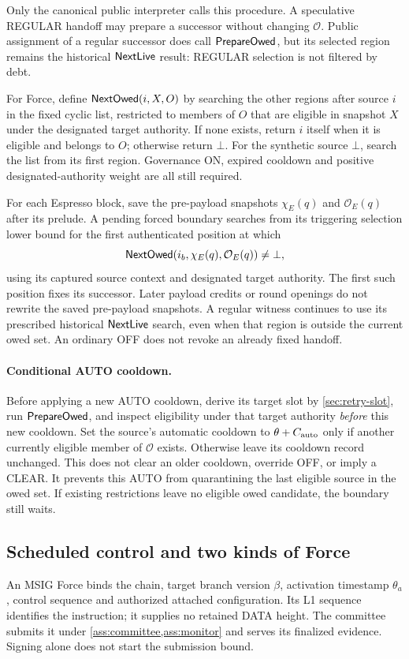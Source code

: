 Only the canonical public interpreter calls this procedure. A
speculative REGULAR handoff may prepare a successor without changing
$\mathcal O$. Public assignment of a regular successor does call
$\mathsf{PrepareOwed}$, but its selected region remains the historical
$\mathsf{NextLive}$ result: REGULAR selection is not filtered by debt.

For Force, define $\mathsf{NextOwed}(i,X,O)$ by searching the other
regions after source $i$ in the fixed cyclic list, restricted to
members of $O$ that are eligible in snapshot $X$ under the designated
target authority. If none exists, return $i$ itself when it is eligible
and belongs to $O$; otherwise return $\bot$. For the synthetic source
$\bot$, search the list from its first region. Governance ON,
expired cooldown and positive designated-authority weight are all
still required.

For each Espresso block, save the pre-payload snapshots
$\chi_E(q)$ and $\mathcal O_E(q)$ after its prelude. A pending forced
boundary searches from its triggering selection lower bound for the
first authenticated position at which
\[
 \mathsf{NextOwed}(i_b,\chi_E(q),\mathcal O_E(q))\ne\bot,
\]
using its captured source context and designated target authority.
The first such position fixes its successor. Later payload credits or
round openings do not rewrite the saved pre-payload snapshots. A
regular witness continues to use its prescribed historical
$\mathsf{NextLive}$ search, even when that region is outside the current
owed set. An ordinary OFF does not revoke an already fixed handoff.

\paragraph{Conditional AUTO cooldown.}
Before applying a new AUTO cooldown, derive its target slot by
\cref{sec:retry-slot}, run $\mathsf{PrepareOwed}$, and inspect eligibility
under that target authority \emph{before} this new cooldown. Set the
source's automatic cooldown to $\theta+C_{\rm auto}$ only if another
currently eligible member of $\mathcal O$ exists. Otherwise leave its
cooldown record unchanged. This does not clear an older cooldown,
override OFF, or imply a CLEAR. It prevents this AUTO from quarantining
the last eligible source in the owed set. If existing restrictions
leave no eligible owed candidate, the boundary still waits.

\subsection{Scheduled control and two kinds of Force}
\label{sec:force-stages}
An MSIG Force binds the chain, target branch version $\beta$,
activation timestamp $\theta_a$, control sequence and authorized
attached configuration. Its L1 sequence identifies the instruction;
it supplies no retained DATA height. The committee submits it under
\cref{ass:committee,ass:monitor} and serves its finalized evidence.
Signing alone does not start the submission bound.

